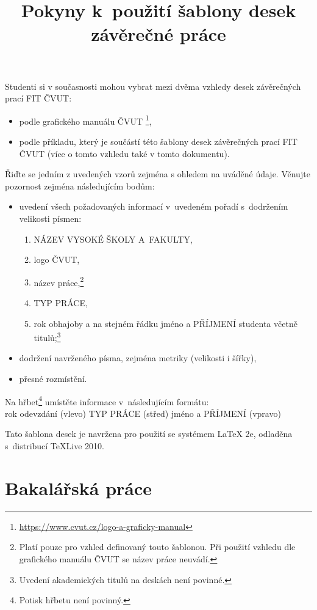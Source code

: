 \documentclass[a4paper]{article}
\title{Pokyny k~použití šablony desek závěrečné práce}
\author{}
\date{}
\begin{document}
\maketitle

\thispagestyle{empty}

\noindent{}Studenti si v současnosti mohou vybrat mezi dvěma vzhledy desek závěrečných prací FIT ČVUT:
\begin{itemize}
	\item podle grafického manuálu ČVUT \footnote{\url{https://www.cvut.cz/logo-a-graficky-manual}},
	\item podle příkladu, který je součástí této šablony desek závěrečných prací FIT ČVUT (více o tomto vzhledu také v tomto dokumentu).
\end{itemize}
Řiďte se jedním z uvedených vzorů zejména s ohledem na uváděné údaje. Věnujte pozornost zejména následujícím bodům:
\begin{itemize}
	\item uvedení všech požadovaných informací v~uvedeném pořadí s~dodržením velikosti písmen:
	\begin{enumerate}
		\item NÁZEV VYSOKÉ ŠKOLY A~FAKULTY,
		\item logo ČVUT,
		\item název práce,\footnote{Platí pouze pro vzhled definovaný touto šablonou. Při použití vzhledu dle grafického manuálu ČVUT se název práce neuvádí.}
		\item TYP PRÁCE,
		\item rok obhajoby a na stejném řádku jméno a PŘÍJMENÍ studenta včetně titulů;\footnote{Uvedení akademických titulů na deskách není povinné.}
	\end{enumerate}
	\item dodržení navrženého písma, zejména metriky (velikosti i šířky),
	\item přesné rozmístění.
\end{itemize}

Na hřbet\footnote{Potisk hřbetu není povinný.} umístěte informace v~následujícím formátu:\\
rok odevzdání (vlevo) \hfill TYP PRÁCE (střed) \hfill jméno a PŘÍJMENÍ (vpravo)

Tato šablona desek je navržena pro použití se systémem \LaTeX{} 2e, odladěna s~distribucí TeXLive 2010.

\section*{Bakalářská práce}
\end{document}
